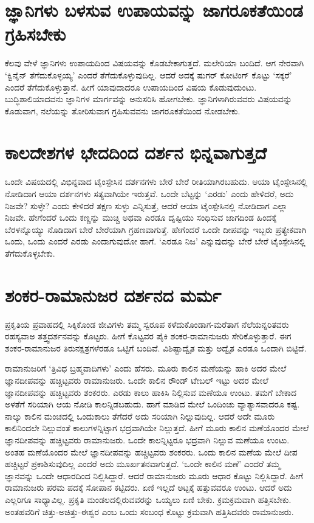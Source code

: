 \section*{ಜ್ಞಾನಿಗಳು ಬಳಸುವ ಉಪಾಯವನ್ನು ಜಾಗರೂಕತೆಯಿಂಡ ಗ್ರಹಿಸಬೇಕು}

ಕೆಲವು ವೇಳೆ ಜ್ಞಾನಿಗಳು ಉಪಾಯದಿಂದ ವಿಷಯವನ್ನು ಕೊಡಬೇಕಾಗುತ್ತದೆ. ಮಲೇರಿಯಾ ಬಂದಿದೆ. ಆಗ ನೇರವಾಗಿ `ಕ್ವಿನೈನ್ ತೆಗೆದುಕೊಳ್ಳಯ್ಯ' ಎಂದರೆ ತೆಗೆದುಕೊಳ್ಳುವುದಿಲ್ಲ. ಆದರೆ ಅದಕ್ಕೆ ಷುಗರ್ ಕೋಟಿಂಗ್ ಕೊಟ್ಟು `ಸಕ್ಕರೆ' ಎಂದರೆ ತೆಗೆದುಕೊಳ್ಳುತ್ತಾನೆ. ಹೀಗೆ ಯಾವುದಾದರೂ ಉಪಾಯದಿಂದ ವಿಷಯ ಕೊಡುವುದುಂಟು. ಬುದ್ಧಿಶಾಲಿಯಾದವನು ಜ್ಞಾನಿಗಳ ಮಾರ್ಗವನ್ನು ಅನುಸರಿಸಿ ಹೋಗಬೇಕು. ಜ್ಞಾನಿಗಳಾಗಿರುವವರು ವಿಷಯವನ್ನು ಕೊಡುವಾಗ, ನಲೆಯನ್ನು ತೋರಿಸುವಾಗ ಗ್ರಹಿಸುವವನು ಜಾಗರೂಕತೆಯಿಂದ ನೋಡಬೇಕು.

\section*{ಕಾಲದೇಶಗಳ ಭೇದದಿಂದ ದರ್ಶನ ಭಿನ್ನವಾಗುತ್ತದೆ}

ಒಂದೇ ವಿಷಯದಲ್ಲಿ ವಿಭಿನ್ನವಾದ ಟೈಂಸ್ಪೇಸಿನ ದರ್ಶನಗಳು ಬೇರೆ ಬೇರೆ  ರೀತಿಯಾಗಿರಬಹುದು. ಆಯಾ ಟೈಂಸ್ಪೇಸಿನಲ್ಲಿ ನೋಡಿದಾಗ ಆಯಾ ದರ್ಶನಗಳು ಸತ್ಯವಾಗಿಯೇ ಇರುತ್ತವೆ. ಒಂದೇ ಬೆಟ್ಟನ್ನು `ಎರಡು' ಎಂದು ಹೇಳಿದರೆ, ಅದು ನಿಜವೇ? ಸುಳ್ಳೇ? ಎಂದು ಕೇಳಿದರೆ ತಕ್ಷಣ ಸುಳ್ಳು ಎನ್ನಿಸುತ್ತೆ, ಆದರೆ ಆಯಾ ಟೈಂಸ್ಪೇಸಿನಲ್ಲಿ ನೋಡಿದಾಗ ಎಲ್ಲಾ ನಿಜವೇ. ಹೇಗೆಂದರೆ ಒಂದು ಕಣ್ಣನ್ನು ಮುಚ್ಚಿ ಅಥವಾ ಎರಡೂ ದೃಷ್ಟಿಯು ಸಂಧಿಸುವ ಜಾಗದಿಂಡ ಹಿಂದಕ್ಕೆ ಬೆರಳನ್ನೊಯ್ಯು ನೊಡಿದಾಗ ಬೇರೆ ಬೇರೆಯಾಗಿ ಗ್ರಹಣವಾಗುತ್ತೆ. ಹೇಗೆಂದರೆ  ಒಂದೇ ದೀಪವನ್ನು ಇಬ್ಬರು ಪ್ರತ್ಯೇಕವಾಗಿ ಒಂದು, ಒಂದು ಎಂದರೆ ಎರಡು ಎಂದಾಗುವುದೋ ಹಾಗೆ. `ಎರಡೂ ನಿಜ' ಎನ್ನುವುದನ್ನು ಬೇರೆ ಬೇರೆ ಟೈಂಸ್ಪೇಸಿನಲ್ಲಿ ತೆಗೆದುಕೊಳ್ಳಬೇಕು.

\section*{ಶಂಕರ-ರಾಮಾನುಜರ ದರ್ಶನದ ಮರ್ಮ}

ಪ್ರಕೃತಿಯ ಪ್ರವಾಹದಲ್ಲಿ ಸಿಕ್ಕಿಕೊಂಡ ಜೀವಿಗಳು ತಮ್ಮ ಸ್ವರೂಪ ಕಳೆದುಕೊಂಡಾಗ-ಮರೆತಾಗ ನೆಲೆಯನ್ನರಿತವರು ರಹಸ್ಯವಾಅ ತತ್ತ್ವದರ್ಶನವನ್ನು ಕೊಟ್ಟರು. ಹೀಗೆ ಕೊಟ್ಟವರ ಪೈಕಿ ಶಂಕರ-ರಾಮಾನುಜರು ಸೇರಿಕೊಳ್ಳುತ್ತಾರೆ. ಈಗ ಶಂಕರ-ರಾಮಾನುಜರ ತಿರುನಕ್ಷತ್ರಗಳೆರಡೂ ಒಟ್ಟಿಗೆ ಬಂದಿವೆ. ವಿಶಿಷ್ಟಾದ್ವೈತ ಮತ್ತು ಅದ್ವೈತ ಎರಡೂ ಒಂದಾಗಿ ಬಿಟ್ಟಿದೆ.

ರಾಮಾನುಜರಿಗೆ `ತ್ರಿವಿಧ ಬ್ರಹ್ಮವಾದಿಗಳು' ಎಂದು ಹೆಸರು. ಮೂರು ಕಾಲಿನ ಮಣೆಯನ್ನು ಹಾಕಿ ಅದರ ಮೇಲೆ ಜ್ಞಾನದೀಪವನ್ನು ಹಚ್ಚಿಟ್ಟವರು ರಾಮಾನುಜರು. ಒಂದೇ ಕಾಲಿನ ರೌಂಡ್ ಟೇಬಲ್ ಇಟ್ಟು ಅದರ ಮೇಲೆ ಜ್ಞಾನದೀಪವನ್ನು ಹಚ್ಚಿಟ್ಟವರು ಶಂಕರರು. ಎರಡು ಕಾಲು ಹಾಕಿಸಿ ನಿಲ್ಲಿಸುವ ಮಣೆಯೂ ಉಂಟು. ತಮಗೆ ಬೇಕಾದ ಅಳತೆಗೆ ಸರಿಯಾಗಿ ಆಯ ನೋಡಿ ಕಾಲನ್ನಿಡಬಹುದು. ಹಾಗೆ ಮಾಡಿದ ಮೇಲೆ ಒಂದಿಂಚು ವ್ಯಾತ್ಯಾಸವಾದರೂ ಕಷ್ಟ. ನಾಲ್ಕು ಕಾಲಿನ ಮಂಚದಲ್ಲಿ ಒಂದುಕಾಲು ತೆಗೆದರೆ ಅದು ಸರಿಯಾಗಿ ನಿಲ್ಲುವುದಿಲ್ಲ. ಆದರೆ ಅದೇ ಮೂರು ಕಾಲಿನಿಂದಲೇ ನಿಲ್ಲುವಂತೆ ಕಾಲುಗಳನ್ನಿಟ್ಟಾಗ ಭದ್ರವಾಗಿಯೇ ನಿಲ್ಲುತ್ತದೆ. ಹೀಗೆ ಮೂರು ಕಾಲಿನ ಮಣೆಯೊಂದರ ಮೇಲೆ ಜ್ಞಾನದೀಪವನ್ನು ಹಚ್ಚಿಟ್ಟವರು ರಾಮಾನುಜರು. ಒಂದೇ ಕಾಲನ್ನಿಟ್ಟರೂ ಭದ್ರವಾಗಿ ನಿಲ್ಲುವ ಮಣೆಯೂ ಉಂಟು. ಅಂತಹ ಮಣೆಯೊಂದರ ಮೇಲೆ ಜ್ಞಾನದೀಪವನ್ನು ಹಚ್ಚಿಟ್ಟವರು ಶಂಕರರು. ಒಂದು ಕಾಲಿನ ಮಣೆಯ ಮೇಲೆ ದೀಪ ಹಚ್ಚಿಟ್ಟರೆ ಪ್ರಕಾಶಿಸುವುದಿಲ್ಲ ಎಂದರೆ ಅದು ಮೂರ್ಖತನವಾಗುತ್ತದೆ. `ಒಂದೇ ಕಾಲಿನ ಮಣೆ' ಎಂದರೆ ತಮ್ಮ ಜ್ಞಾನವನ್ನು ಒಂದೇ ಆಧಾರದಿಂದ ನಿಲ್ಲಿಸಿದ್ದಾರೆ. ಆದರೆ ರಾಮಾನುಜರು ಮೂರು ಆಧಾರ ಕೊಟ್ಟು ನಿಲ್ಲಿಸಿದ್ದಾರೆ. ಹೀಗೆ ರಾಮಾನುಜರು ಪರಮ ಪದಕ್ಕೆ ಸೋಪಾನ ಕಟ್ಟಿದರು. ಏಣಿ ಇಲ್ಲದೆ ಅಟ್ಟಕ್ಕೆ ಹತ್ತುವವರೂ ಉಂಟು. ಆದರೆ ಅದು ಎಲ್ಲರಿಗೂ ಸಾಧ್ಯಾವಿಲ್ಲ. ಪ್ರಕೃತಿ ಮಂಡಲದಲ್ಲಿರುವವರನ್ನು ಒಯ್ಯಲು ಏಣಿ ಬೇಕು. ಕ್ರಮಕ್ರಮವಾಗಿ ಹತ್ತಿಸಬೇಕು. ಅಂತಹವರಿಗೆ ಚಿತ್ತು-ಅಚಿತ್ತು-ಈಶ್ವರ ಎಂಬ ಒಂದು ಸಂಬಂಧ ಕೊಟ್ಟು ಕ್ರಮವಾಗಿ ಹತ್ತಿಸಿದವರು ರಾಮಾನುಜರು.

